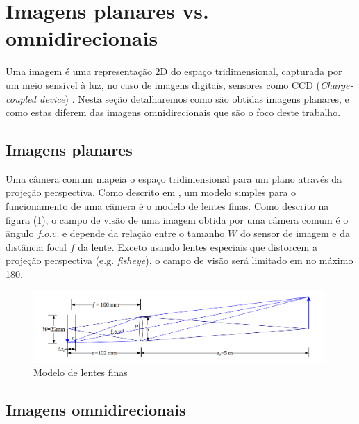 \documentclass[cic,tc]{iiufrgs}
\begin{document}
\section{Imagens planares vs. omnidirecionais}

Uma imagem é uma representação 2D do espaço tridimensional, capturada por um meio sensível à luz, no caso de imagens digitais, sensores como CCD (\textit{Charge-coupled device}) \citep{Gonzalez}. Nesta seção detalharemos como são obtidas imagens planares, e como estas diferem das imagens omnidirecionais que são o foco deste trabalho.

\subsection{Imagens planares}

Uma câmera comum mapeia o espaço tridimensional para um plano através da projeção perspectiva. Como descrito em \citet{Szeliski}, um modelo simples para o funcionamento de uma câmera é o modelo de lentes finas. Como descrito na figura (\ref{fig:lens-fov}), o campo de visão de uma imagem obtida por uma câmera comum é o ângulo $f.o.v.$ e depende da relação entre o tamanho $W$ do sensor de imagem e da distância focal $f$ da lente. Exceto usando lentes especiais que distorcem a projeção perspectiva (e.g. \textit{fisheye}), o campo de visão será limitado em no máximo 180\degree .

\begin{figure}
    \caption{Modelo de lentes finas}
    \begin{center}
        \includegraphics[width=30em]{lens-fov.png}
    \end{center}
    \label{fig:lens-fov}
\end{figure}

\subsection{Imagens omnidirecionais}
\end{document}
